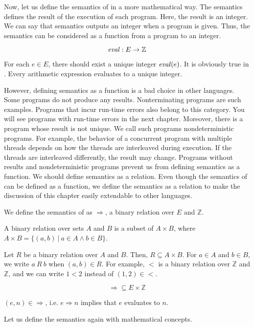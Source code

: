 Now, let us define the semantics of \Lang in a more mathematical way. The
semantics defines the result of the execution of each program. Here, the result
is an integer. We can say that semantics outputs an integer when a program is
given. Thus, the semantics can be considered as a function from a program to an
integer.

\[\mbox{\emph{eval}}:E\rightarrow \mathbb{Z}\]

For each $e\in E$, there should exist a unique integer $\mbox{\emph{eval}}(e)$. It
is obviously true in \Lang. Every arithmetic expression evaluates to a unique
integer.

However, defining semantics as a function is a bad choice in other languages.
Some programs do not produce any results. Nonterminating programs are such
examples. Programs that incur run-time errors also belong to this category. You
will see programs with run-time errors in the next chapter. Moreover, there is a
program whose result is not unique. We call such programs nondeterministic
programs. For example, the behavior of a concurrent program with multiple
threads depends on how the threads are interleaved during execution. If the
threads are interleaved differently, the result may change. Programs without
results and nondeterministic programs prevent us from defining semantics as a
function. We should define semantics as a relation. Even though the semantics of
\Lang can be defined as a function, we define the semantics as a relation to
make the discussion of this chapter easily extendable to other languages.

We define the semantics of \Lang as $\Rightarrow$, a binary relation over $E$
and $\mathbb{Z}$.

\begin{kaobox}[frametitle=Binary relations]
A binary relation over sets $A$ and $B$ is a subset of $A\times B$,
where $A\times B=\{(a,b)\ |\ a\in A\land b\in B\}$.

Let $R$ be a binary relation over $A$ and $B$. Then, $R \subseteq A\times B$. For $a\in
A$ and $b\in B$, we write $a\ R\ b$ when $(a,b)\in R$. For example, $<$ is a
binary relation over $\mathbb{Z}$ and $\mathbb{Z}$, and we can write $1<2$ instead of
$(1,2)\in<$.
\end{kaobox}

\[\Rightarrow\subseteq E\times\mathbb{Z}\]

$(e,n)\in\Rightarrow$, i.e. $e\Rightarrow n$ implies that $e$ evaluates to $n$.

Let us define the semantics again with mathematical concepts.

